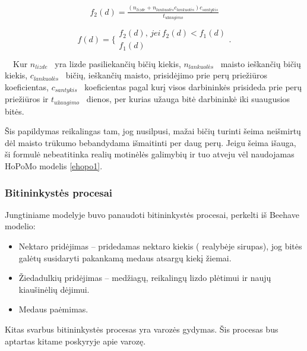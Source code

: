 \documentclass{VUMIFPSmagistrinis}
\begin{document}
\begin{equation}
\label{ekd3}
\begin{matrix}f_2(d)=\frac{(n_{\mathit{lizde}}+n_{\mathit{lankuol\text{\.e}s}}c_{\mathit{lankuol\text{\.e}s}})c_{\mathit{santykis}}}{t_{\mathit{u\text{\v{z}}augimo}}}\\\end{matrix}
\end{equation}
\begin{equation}
\label{ehopo1}
\begin{matrix}f(d)=\{\begin{matrix}f_2(d),\,jei\,f_2(d)<f_1(d)\\f_1(d)\end{matrix}.\\\end{matrix}
\end{equation}
\ \ Kur  $n_{\mathit{lizde}}$ \ yra lizde pasiliekan\v{c}i\k{u} bi\v{c}i\k{u} kiekis,  $n_{\mathit{lankuol\text{\.e}s}}$ \ maisto ie\v{s}kan\v{c}i\k{u} bi\v{c}i\k{u} kiekis,  $c_{\mathit{lankuol\text{\.e}s}}$ \ bi\v{c}i\k{u}, ie\v{s}kan\v{c}i\k{u} maisto, prisid\.ejimo prie per\k{u} prie\v{z}i\=uros koeficientas,  $c_{\mathit{santykis}}$ \ koeficientas pagal kur\k{i} visos darbinink\.es prisideda prie per\k{u} prie\v{z}i\=uros ir  $t_{\mathit{u\text{\v{z}}augimo}}$ \ dienos, per kurias u\v{z}auga bit\.e darbinink\.e iki suaugusios bit\.es.

\v{S}is papildymas reikalingas tam, jog nusilpusi, ma\v{z}ai bi\v{c}i\k{u} turinti \v{s}eima nei\v{s}mirt\k{u} d\.el maisto tr\=ukumo bebandydama i\v{s}maitinti per daug per\k{u}. Jeigu \v{s}eima i\v{s}auga, \v{s}i formul\.e nebeatitinka reali\k{u} motin\.el\.es galimybi\k{u} ir tuo atveju v\.el naudojamas HoPoMo modelis \eqref{ehopo1}.

\subsubsection{Bitininkyst\.es procesai}
Jungtiniame modelyje buvo panaudoti bitininkystės procesai, perkelti iš Beehave modelio:

\begin{itemize}
\item Nektaro prid\.ejimas -- pridedamas nektaro kiekis ( realyb\.eje sirupas), jog bit\.es gal\.et\k{u} susidaryti pakankam\k{a} medaus atsarg\k{u} kiek\k{i} \v{z}iemai.
\item \v{Z}iedadulki\k{u} prid\.ejimas -- med\v{z}iag\k{u}, reikaling\k{u} lizdo pl\.etimui ir nauj\k{u} kiau\v{s}in\.eli\k{u} d\.ejimui.
\item Medaus pa\.emimas.
\end{itemize}
Kitas svarbus bitininkyst\.es procesas yra varoz\.es gydymas. \v{S}is procesas bus aptartas kitame poskyryje apie varoz\k{e}.
\end{document}

